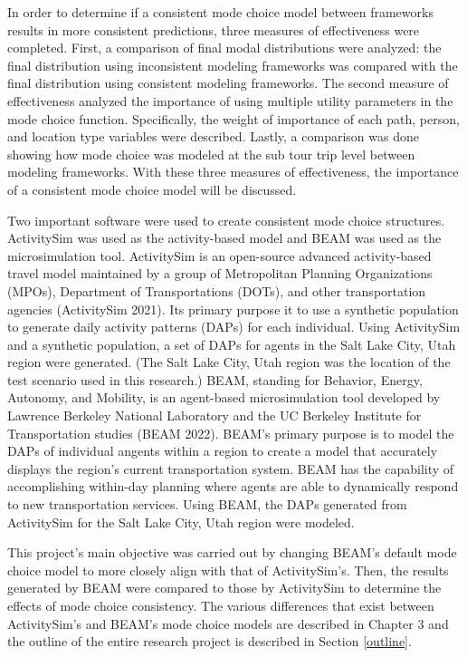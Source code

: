 \documentclass[12pt, oneside, openright]{byuthesis}
\begin{document}
In order to determine if a consistent mode choice model between frameworks results in more consistent predictions, three measures of effectiveness were completed. First, a comparison of final modal distributions were analyzed: the final distribution using inconsistent modeling frameworks was compared with the final distribution using consistent modeling frameworks. The second measure of effectiveness analyzed the importance of using multiple utility parameters in the mode choice function. Specifically, the weight of importance of each path, person, and location type variables were described. Lastly, a comparison was done showing how mode choice was modeled at the sub tour trip level between modeling frameworks. With these three measures of effectiveness, the importance of a consistent mode choice model will be discussed.

Two important software were used to create consistent mode choice structures. ActivitySim was used as the activity-based model and BEAM was used as the microsimulation tool. ActivitySim is an open-source advanced activity-based travel model maintained by a group of Metropolitan Planning Organizations (MPOs), Department of Transportations (DOTs), and other transportation agencies (ActivitySim 2021). Its primary purpose it to use a synthetic population to generate daily activity patterns (DAPs) for each individual. Using ActivitySim and a synthetic population, a set of DAPs for agents in the Salt Lake City, Utah region were generated. (The Salt Lake City, Utah region was the location of the test scenario used in this research.) BEAM, standing for Behavior, Energy, Autonomy, and Mobility, is an agent-based microsimulation tool developed by Lawrence Berkeley National Laboratory and the UC Berkeley Institute for Transportation studies (BEAM 2022). BEAM's primary purpose is to model the DAPs of individual angents within a region to create a model that accurately displays the region's current transportation system. BEAM has the capability of accomplishing within-day planning where agents are able to dynamically respond to new transportation services. Using BEAM, the DAPs generated from ActivitySim for the Salt Lake City, Utah region were modeled.

This project's main objective was carried out by changing BEAM's default mode choice model to more closely align with that of ActivitySim's. Then, the results generated by BEAM were compared to those by ActivitySim to determine the effects of mode choice consistency. The various differences that exist between ActivitySim's and BEAM's mode choice models are described in Chapter 3 and the outline of the entire research project is described in Section \ref{outline}.
\end{document}
